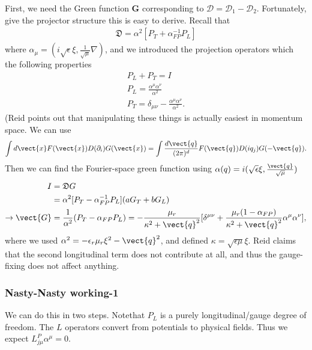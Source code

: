First, we need the Green function $\mathbf{G}$ corresponding to $\mathcal{D} =\mathcal{D}_1-\mathcal{D}_2$.
Fortunately, give the projector structure this is easy to derive.  Recall that
\begin{align}
  \mathfrak{D} = \alpha^2[P_T +\alpha^{-1}_{FP}P_L]
\end{align}
where $\alpha_\mu=(i\sqrt{\epsilon}\xi,\frac{1}{\sqrt{\mu}}\nabla)$, and we introduced
the projection operators which the following properties
\begin{gather}
  P_L+P_T = I\\
  P_L = \frac{\alpha^\mu\alpha^\nu}{\alpha^2}\\
  P_T = \delta_{\mu\nu}-\frac{\alpha^\mu\alpha^\nu}{\alpha^2}.
\end{gather}
(Reid points out that manipulating these things is actually easiest in momentum space.  We can use
\begin{equation}
  \int d\vect{x} F(\vect{x})D(\partial_i)G(\vect{x}) = \int \frac{d\vect{q}}{(2\pi)^d}
  F(\vect{q})D(i q_j)G(-\vect{q}).
\end{equation}
Then we can find the Fourier-space green function using 
$\alpha(q) = i(\sqrt{\epsilon}\xi,\frac{\vect{q}}{\sqrt{\mu}})$
\begin{align}
  I &=\mathfrak{D}G \\
  &=\alpha^2[P_T -\alpha^{-1}_{FP}P_L](a G_T+bG_L)\\
  \rightarrow \vect{G}& = \frac{1}{\alpha^2}(P_T - \alpha_{FP}P_L)
   = -\frac{\mu_r}{\kappa^2+\vect{q}^2}[\delta^{\mu\nu}
  + \frac{\mu_r(1-\alpha_{FP})}{\kappa^2+\vect{q}^2}\alpha^\mu\alpha^\nu],
\end{align}
where we used $\alpha^2 = -\epsilon_r\mu_r\xi^2-\vect{q}^2$,  and defined 
$\kappa = \sqrt{\epsilon\mu}\xi$.
Reid claims that the second longitudinal term does not contribute at all, and thus the 
gauge-fixing does not affect anything.  

\subsubsection{Nasty-Nasty working-1}

We can do this in two steps.  
Notethat $P_L$ is a purely longitudinal/gauge degree of freedom.  The $L$ operators 
convert from potentials to physical fields.  Thus we expect $L^P_{j\mu} \alpha^\mu=0$.

